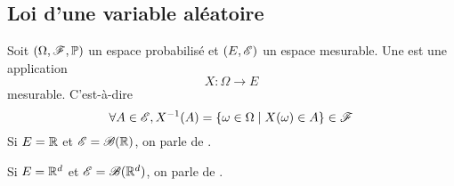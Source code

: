 \subsection{Loi d'une variable aléatoire}\label{subsubsec:2-1}

\begin{definition}
    Soit \((\Omega, \mathscr{F}, \mathbb{P})\) un espace probabilisé et \((E, \mathscr{E})\) un espace mesurable. 
    Une  est une application
    \begin{equation*}
        X\colon \Omega \to E
    \end{equation*}
    mesurable. C'est-à-dire 
    \begin{equation*}
        \forall A\in\mathscr{E}, X^{-1}(A) = \{\omega\in\Omega\mid X(\omega)\in A\}\in\mathscr{F}
    \end{equation*}
    Si \(E = \mathbb{R}\) et \(\mathscr{E} = \mathscr{B}(\mathbb{R})\), on parle de .

    Si \(E = \mathbb{R}^d\) et \(\mathscr{E} = \mathscr{B}(\mathbb{R}^d)\), on parle de .
\end{definition}

